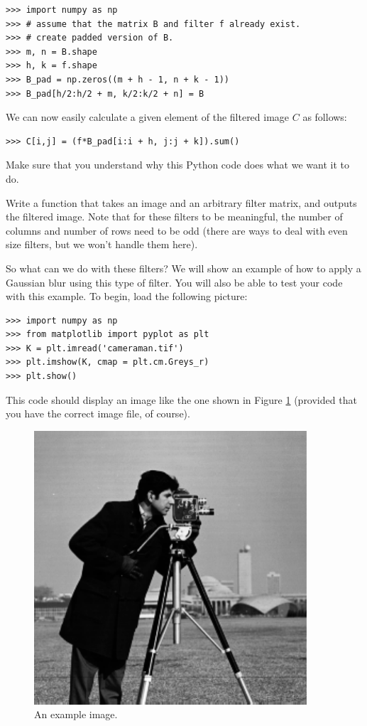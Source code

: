 \begin{lstlisting}
>>> import numpy as np
>>> # assume that the matrix B and filter f already exist.
>>> # create padded version of B.
>>> m, n = B.shape
>>> h, k = f.shape
>>> B_pad = np.zeros((m + h - 1, n + k - 1))
>>> B_pad[h/2:h/2 + m, k/2:k/2 + n] = B
\end{lstlisting}

We can now easily calculate a given element of the filtered image $C$ as follows:
\begin{lstlisting}
>>> C[i,j] = (f*B_pad[i:i + h, j:j + k]).sum()
\end{lstlisting}

Make sure that you understand why this Python code does what we want it to do.
\begin{problem}
Write a function  that takes an image and an arbitrary filter matrix, and outputs the
filtered image. Note that for these filters to be meaningful, the number of columns and number 
of rows need to be odd (there are ways to deal with even size filters, but we won't handle them here).
\end{problem}

So what can we do with these filters? We will show an example of how to apply a Gaussian blur 
using this type of filter. You will also be able to test your code with this example. 
To begin, load the following picture:

\begin{lstlisting}
>>> import numpy as np
>>> from matplotlib import pyplot as plt
>>> K = plt.imread('cameraman.tif')
>>> plt.imshow(K, cmap = plt.cm.Greys_r)
>>> plt.show()
\end{lstlisting}

This code should display an image like the one shown in Figure \ref{imfil:camclean} (provided
that you have the correct image file, of course).

\begin{figure}
\includegraphics{cameramanClean.pdf}
\caption{An example image.}
\label{imfil:camclean}
\end{figure}

